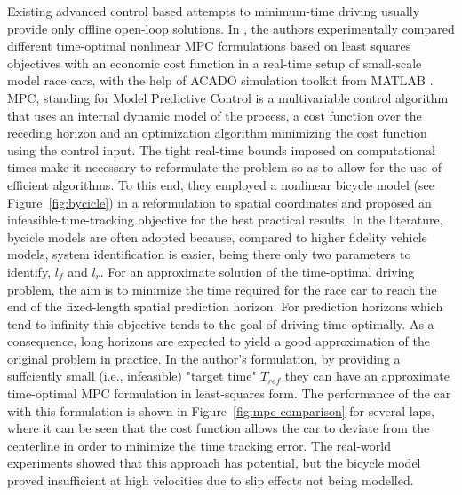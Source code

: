 Existing advanced control based attempts to minimum-time driving usually provide only offline open-loop solutions.
In \cite{mpc}, the authors experimentally compared different time-optimal nonlinear MPC \cite{mpc_orig} formulations based on least squares objectives with an economic cost function in a real-time setup of small-scale model race cars, with the help of ACADO simulation toolkit from MATLAB \cite{acado}.
MPC, standing for Model Predictive Control is a multivariable control algorithm that uses an internal dynamic model of the process, a cost function over the receding horizon and an optimization algorithm minimizing the cost function using the control input.
The tight real-time bounds imposed on computational times make it necessary to reformulate the problem so as to allow for the use of efficient algorithms. To this end, they employed a nonlinear bicycle model \cite{bycicle} (see Figure~\ref{fig:bycicle}) in a reformulation to spatial coordinates and proposed an infeasible-time-tracking objective for the best practical results. In the literature, bycicle models are often adopted because, compared to higher fidelity vehicle models, system identification is easier, being there only two parameters to identify, $l_f$ and $l_r$.
For an approximate solution of the time-optimal driving problem, the aim is to minimize the time required for the race car to reach the end of the fixed-length spatial prediction horizon. For prediction horizons which tend to infinity this objective tends to the goal of driving time-optimally. As a consequence, long horizons are expected to yield a good approximation of the original problem in practice.
In the author's formulation, by providing a suffciently small (i.e., infeasible) "target time" \(T_{ref}\) they can have an approximate time-optimal MPC formulation in least-squares form. The performance of the car with this formulation is shown in Figure~\ref{fig:mpc-comparison} for several laps, where it can be seen that the cost
function allows the car to deviate from the centerline in order to minimize the time tracking error.
The real-world experiments showed that this approach has potential, but the bicycle model proved insufficient at high velocities due to slip effects not being modelled.
